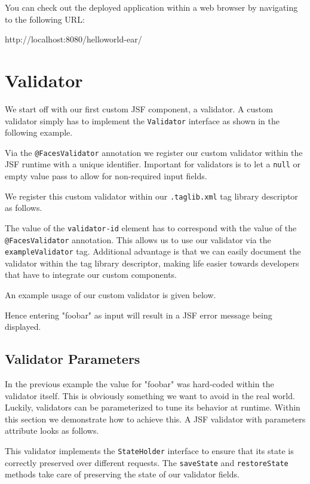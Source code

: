You can check out the deployed application within a web browser by navigating to the following URL:

http://localhost:8080/helloworld-ear/

\section{Validator}
\label{sec:validator}
We start off with our first custom JSF component, a validator.
A custom validator simply has to implement the \texttt{Validator} interface as shown in the following example.

Via the \texttt{@FacesValidator} annotation we register our custom validator within the JSF runtime with a unique identifier.
Important for validators is to let a \texttt{null} or empty value pass to allow for non-required input fields.

We register this custom validator within our \texttt{.taglib.xml} tag library descriptor as follows.

The value of the \texttt{validator-id} element has to correspond with the value of the \texttt{@Faces\allowbreak Validator} annotation.
This allows us to use our validator via the \texttt{exampleValidator} tag.
Additional advantage is that we can easily document the validator within the tag library descriptor, making life easier towards developers that have to integrate our custom components.

An example usage of our custom validator is given below.

Hence entering "foobar" as input will result in a JSF error message being displayed.


\subsection{Validator Parameters}
\label{sec:validator-parameters}
In the previous example the value for "foobar" was hard-coded within the validator itself.
This is obviously something we want to avoid in the real world.
Luckily, validators can be parameterized to tune its behavior at runtime.
Within this section we demonstrate how to achieve this.
A JSF  validator with parameters attribute looks as follows.

This validator implements the \texttt{StateHolder} interface to ensure that its state is correctly preserved over different requests.
The \texttt{saveState} and \texttt{restoreState} methods take care of preserving the state of our validator fields.

